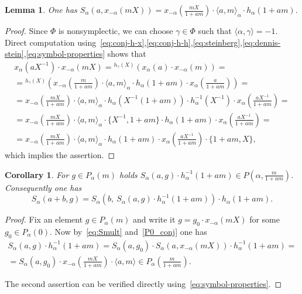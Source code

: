 \documentclass[oneside, 8pt]{amsart}
\newtheorem{corollary}{Corollary}
\newtheorem{lemma}{Lemma}
\theoremstyle{remark}
\theoremstyle{definition}
\numberwithin{equation}{section}
\begin{document}
\begin{lemma} \label{lem:Tulenbayev-formula} 
One has $S_\alpha(a, x_{-\alpha}(mX)) = x_{-\alpha}\left(\tfrac{mX}{1+am}\right) \cdot \langle a, m\rangle_\alpha \cdot h_\alpha(1+am).$
\end{lemma}
\begin{proof} Since $\Phi$ is nonsymplectic, we can choose $\gamma \in \Phi$ such that $\langle \alpha, \gamma \rangle = -1$. Direct computation using~\eqref{eq:conj-h-x},\eqref{eq:conj-h-h},\eqref{eq:steinberg},\eqref{eq:dennis-stein},\eqref{eq:symbol-properties} shows that
 \begin{multline*}
 x_\alpha(aX^{-1}) \cdot x_{-\alpha}(mX) = {}^{h_\gamma(X)}(x_\alpha(a) \cdot x_{-\alpha}(m)) = \\
 = {}^{h_\gamma(X)}\left( x_{-\alpha}\left(\tfrac{m}{1+am}\right) \cdot \langle a, m\rangle_\alpha \cdot h_\alpha(1+am) \cdot x_\alpha\left(\tfrac{a}{1+am}\right) \right) = \\
 = x_{-\alpha}\left(\tfrac{mX}{1+am}\right) \cdot \langle a, m\rangle_\alpha \cdot h_\alpha(X^{-1}(1+am))\cdot h_\alpha^{-1}\left(X^{-1}\right) \cdot x_{\alpha}\left(\tfrac{aX^{-1}}{1+am}\right) = \\
 = x_{-\alpha}\left(\tfrac{mX}{1+am}\right) \cdot \langle a, m\rangle_\alpha \cdot \{X^{-1}, 1+am\} \cdot h_\alpha(1+am)\cdot x_{\alpha}\left(\tfrac{aX^{-1}}{1+am}\right) = \\
 = x_{-\alpha}\left(\tfrac{mX}{1+am}\right) \cdot \langle a, m\rangle_\alpha \cdot h_\alpha(1+am) \cdot x_{\alpha}\left(\tfrac{aX^{-1}}{1+am}\right) \cdot \{1+am, X\}, \end{multline*}
which implies the assertion. \end{proof}

\begin{corollary}\label{SR:additivity} For $g \in P_\alpha(m)$ holds $S_\alpha(a, g) \cdot h_\alpha^{-1}(1 + am) \in P(\alpha, \tfrac{m}{1 + am})$.
Consequently one has \[ S_\alpha(a+b, g) = S_\alpha\left(b,\ S_\alpha(a, g) \cdot h_\alpha^{-1}(1 + am)\right)\cdot h_\alpha(1+am). \]\end{corollary} \begin{proof}
Fix an element $g \in P_\alpha(m)$ and write it $g = g_0 \cdot x_{-\alpha}(mX)$ for some $g_0 \in P_\alpha(0)$.
Now by~\eqref{eq:Smult} and~\cref{P0_conj} one has
\begin{multline} \nonumber S_\alpha(a, g) \cdot h_{\alpha}^{-1}(1+am) = S_\alpha(a, g_0) \cdot S_\alpha(a, x_{-\alpha}(mX)) \cdot h_{\alpha}^{-1}(1+am) = 
\\ = S_\alpha(a, g_0) \cdot x_{-\alpha}\left(\tfrac{mX}{1+am}\right) \cdot\langle a, m \rangle \in P_\alpha\left(\tfrac{m}{1+am}\right). \end{multline}

The second assertion can be verified directly using~\eqref{eq:symbol-properties}. \end{proof}
\end{document}
